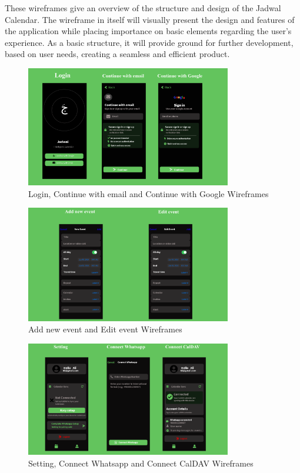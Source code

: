 These wireframes give an overview of the structure and design of the Jadwal Calendar. The wireframe in itself will visually present the design and features of the application while placing importance on basic elements regarding the user's experience. As a basic structure, it will provide ground for further development, based on user needs, creating a seamless and efficient product.
\begin{figure}[H]
    \centering
    \includegraphics[width=0.8\textwidth]{images/front-end1.png}
    \caption{Login, Continue with email and Continue with Google Wireframes}
    \label{fig:wireframe-login}
\end{figure}

\begin{figure}[H]
    \centering
    \includegraphics[width=0.8\textwidth]{images/front-end2.png}
    \caption{Add new event and Edit event Wireframes}
    \label{fig:wireframe-events}
\end{figure}

\begin{figure}[H]
    \centering
    \includegraphics[width=0.8\textwidth]{images/front-end3.png}
    \caption{Setting, Connect Whatsapp and Connect CalDAV Wireframes}
    \label{fig:wireframe-settings}
\end{figure}


